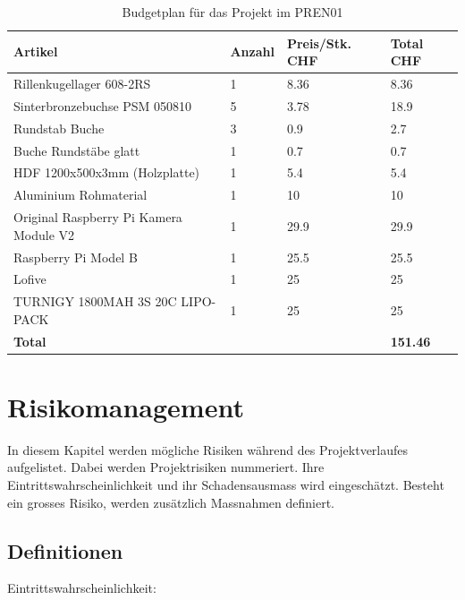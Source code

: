 \documentclass[a4paper]{report}
\begin{document}
\vspace{1em}
\noindent
\begin{table}[h]
	\begin{tabular}{|p{}|p{}|p{}||p{}|}
	\hline
	\textbf{Artikel} & \textbf{Anzahl} & \textbf{Preis/Stk. CHF} & \textbf{Total CHF} \\
	\hline
	Rillenkugellager 608-2RS & 1 & 8.36 & 8.36 \\
	\hline
	Sinterbronzebuchse PSM 050810 & 5 & 3.78 & 18.9 \\
	\hline
	Rundstab Buche & 3 & 0.9 & 2.7 \\
	\hline
	Buche Rundstäbe glatt & 1 & 0.7 & 0.7 \\
	\hline
	HDF 1200x500x3mm (Holzplatte) & 1 & 5.4 & 5.4 \\
	\hline
	Aluminium Rohmaterial & 1 & 10 & 10 \\
	\hline
	Original Raspberry Pi Kamera Module V2 & 1 & 29.9 & 29.9 \\
	\hline
	Raspberry Pi Model B & 1 & 25.5 & 25.5 \\
	\hline
	Lofive & 1 & 25 & 25 \\
	\hline
	TURNIGY 1800MAH 3S 20C LIPO-PACK & 1 & 25 & 25\\
	\hline
	\textbf{Total} & & & \textbf{151.46} \\
	\hline
	\end{tabular}
	\caption{Budgetplan für das Projekt im PREN01}
	\label{tab:Budgetplan}
\end{table}

\chapter{Risikomanagement}
\label{ch:RisikoMgmt}
In diesem Kapitel werden mögliche Risiken während des Projektverlaufes aufgelistet. Dabei werden Projektrisiken nummeriert. Ihre Eintrittswahrscheinlichkeit und ihr Schadensausmass wird eingeschätzt. Besteht ein grosses Risiko, werden zusätzlich Massnahmen definiert.

\section{Definitionen}
\label{sec:Def}
\vspace{1em}
\noindent
Eintrittswahrscheinlichkeit:
\end{document}
